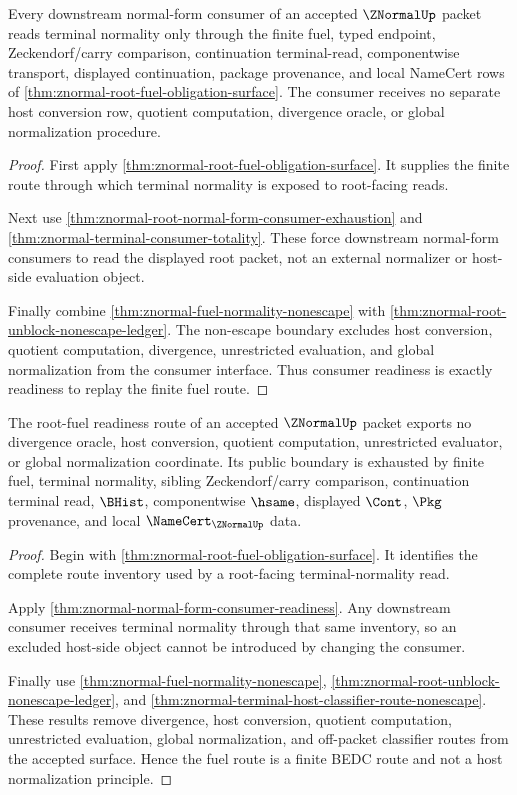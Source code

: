 \begin{theorem}
\label{thm:znormal-normal-form-consumer-readiness}
Every downstream normal-form consumer of an accepted $\ZNormalUp$ packet reads
terminal normality only through the finite fuel, typed endpoint,
Zeckendorf/carry comparison, continuation terminal-read, componentwise
transport, displayed continuation, package provenance, and local NameCert rows
of \autoref{thm:znormal-root-fuel-obligation-surface}. The consumer receives no
separate host conversion row, quotient computation, divergence oracle, or
global normalization procedure.
\end{theorem}
\begin{proof}
First apply \autoref{thm:znormal-root-fuel-obligation-surface}. It supplies the
finite route through which terminal normality is exposed to root-facing reads.

Next use \autoref{thm:znormal-root-normal-form-consumer-exhaustion} and
\autoref{thm:znormal-terminal-consumer-totality}. These force downstream
normal-form consumers to read the displayed root packet, not an external
normalizer or host-side evaluation object.

Finally combine \autoref{thm:znormal-fuel-normality-nonescape} with
\autoref{thm:znormal-root-unblock-nonescape-ledger}. The non-escape boundary
excludes host conversion, quotient computation, divergence, unrestricted
evaluation, and global normalization from the consumer interface. Thus
consumer readiness is exactly readiness to replay the finite fuel route.
\end{proof}

\begin{theorem}
\label{thm:znormal-fuel-route-nonescape}
The root-fuel readiness route of an accepted $\ZNormalUp$ packet exports no
divergence oracle, host conversion, quotient computation, unrestricted
evaluator, or global normalization coordinate. Its public boundary is exhausted
by finite fuel, terminal normality, sibling Zeckendorf/carry comparison,
continuation terminal read, $\BHist$, componentwise $\hsame$, displayed
$\Cont$, $\Pkg$ provenance, and local $\NameCert_{\ZNormalUp}$ data.
\end{theorem}
\begin{proof}
Begin with \autoref{thm:znormal-root-fuel-obligation-surface}. It identifies
the complete route inventory used by a root-facing terminal-normality read.

Apply \autoref{thm:znormal-normal-form-consumer-readiness}. Any downstream
consumer receives terminal normality through that same inventory, so an
excluded host-side object cannot be introduced by changing the consumer.

Finally use \autoref{thm:znormal-fuel-normality-nonescape},
\autoref{thm:znormal-root-unblock-nonescape-ledger}, and
\autoref{thm:znormal-terminal-host-classifier-route-nonescape}. These results
remove divergence, host conversion, quotient computation, unrestricted
evaluation, global normalization, and off-packet classifier routes from the
accepted surface. Hence the fuel route is a finite BEDC route and not a host
normalization principle.
\end{proof}
